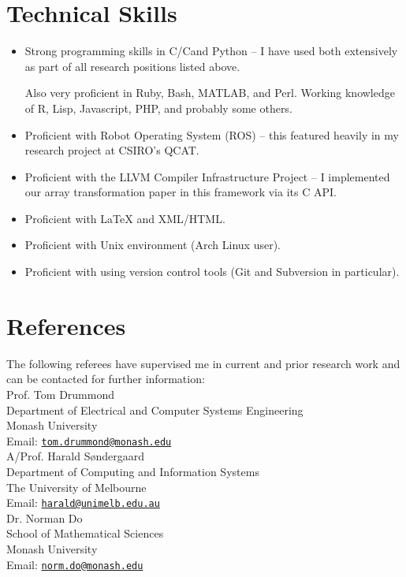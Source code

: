 \documentclass[12pt,a4paper]{article}
\newcommand{\mailto}[1]{\href{mailto:#1}{\texttt{#1}}}
\newcommand{\CPP}
{C\nolinebreak[4]\hspace{-.05em}\raisebox{.22ex}{\footnotesize\bf ++ }}
\begin{document}
\section*{Technical Skills}
\begin{itemize}
  \item Strong programming skills in C/\CPP and Python -- I have used both
    extensively as part of all research positions listed above.

    Also very proficient in Ruby, Bash, MATLAB, and Perl. Working knowledge of
    R, Lisp, Javascript, PHP, and probably some others.
  \item Proficient with Robot Operating System (ROS) -- this featured heavily
    in my research project at CSIRO's QCAT.
  \item Proficient with the LLVM Compiler Infrastructure Project -- I
    implemented our array transformation paper in this framework via its \CPP
    API.
  \item Proficient with {\LaTeX} and XML/HTML.
  \item Proficient with Unix environment (Arch Linux user).
  \item Proficient with using version control tools (Git and Subversion in
    particular).
\end{itemize}

\pagebreak

\section*{References}
The following referees have supervised me in current and prior research work
and can be contacted for further information: \\

\noindent
Prof. Tom Drummond  \\
Department of Electrical and Computer Systems Engineering \\
Monash University \\
Email: \mailto{tom.drummond@monash.edu} \\

\noindent
A/Prof. Harald S\o ndergaard  \\
Department of Computing and Information Systems \\
The University of Melbourne \\
Email: \mailto{harald@unimelb.edu.au} \\

\noindent
Dr. Norman Do \\
School of Mathematical Sciences \\
Monash University \\
Email: \mailto{norm.do@monash.edu} \\
\end{document}
